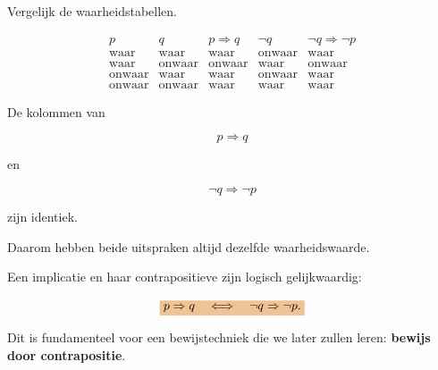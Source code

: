 \documentclass{ximera}
\begin{document}

Vergelijk de waarheidstabellen.

\[
\begin{array}{c|c|c|c|c}
p&q&p\Rightarrow q&\neg q&\neg q\Rightarrow\neg p\\
\hline
\text{waar}&\text{waar}&\text{waar}&\text{onwaar}&\text{waar}\\
\text{waar}&\text{onwaar}&\text{onwaar}&\text{waar}&\text{onwaar}\\
\text{onwaar}&\text{waar}&\text{waar}&\text{onwaar}&\text{waar}\\
\text{onwaar}&\text{onwaar}&\text{waar}&\text{waar}&\text{waar}
\end{array}
\]

De kolommen van

\[
p\Rightarrow q
\]

en

\[
\neg q\Rightarrow\neg p
\]

zijn identiek.

Daarom hebben beide uitspraken altijd dezelfde waarheidswaarde.


\begin{opmerking}

Een implicatie en haar contrapositieve zijn logisch gelijkwaardig:

\[
\important{
p\Rightarrow q
\quad\Longleftrightarrow\quad
\neg q\Rightarrow\neg p.
}
\]

Dit is fundamenteel voor een bewijstechniek die we later zullen leren:
\textbf{bewijs door contrapositie}.

\end{opmerking}
\end{document}
